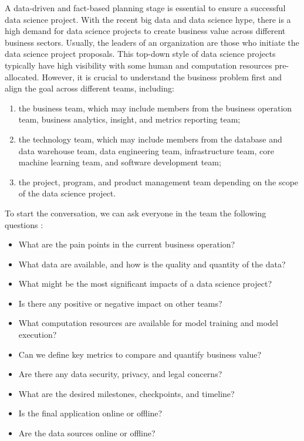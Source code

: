 \documentclass[
  12pt,
]{krantz}
\providecommand{\tightlist}{%
  \setlength{\itemsep}{0pt}\setlength{\parskip}{0pt}}
\begin{document}
A data-driven and fact-based planning stage is essential to ensure a successful data science project. With the recent big data and data science hype, there is a high demand for data science projects to create business value across different business sectors. Usually, the leaders of an organization are those who initiate the data science project proposals. This top-down style of data science projects typically have high visibility with some human and computation resources pre-allocated. However, it is crucial to understand the business problem first and align the goal across different teams, including:

\begin{enumerate}
\def\labelenumi{(\arabic{enumi})}
\item
  the business team, which may include members from the business operation team, business analytics, insight, and metrics reporting team;
\item
  the technology team, which may include members from the database and data warehouse team, data engineering team, infrastructure team, core machine learning team, and software development team;
\item
  the project, program, and product management team depending on the scope of the data science project.
\end{enumerate}

To start the conversation, we can ask everyone in the team the following questions :

\begin{itemize}
\tightlist
\item
  What are the pain points in the current business operation?
\item
  What data are available, and how is the quality and quantity of the data?
\item
  What might be the most significant impacts of a data science project?
\item
  Is there any positive or negative impact on other teams?
\item
  What computation resources are available for model training and model execution?
\item
  Can we define key metrics to compare and quantify business value?
\item
  Are there any data security, privacy, and legal concerns?
\item
  What are the desired milestones, checkpoints, and timeline?
\item
  Is the final application online or offline?
\item
  Are the data sources online or offline?
\end{itemize}
\end{document}
